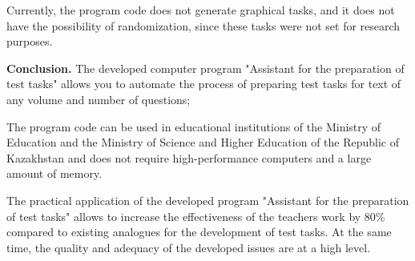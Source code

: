 \begin{multicols}{2}
Currently, the program code does not generate graphical tasks, and it
does not have the possibility of randomization, since these tasks were
not set for research purposes.

{\bfseries Conclusion.} The developed computer program "Assistant for the
preparation of test tasks" allows you to automate the process of
preparing test tasks for text of any volume and number of questions;

The program code can be used in educational institutions of the Ministry
of Education and the Ministry of Science and Higher Education of the
Republic of Kazakhstan and does not require high-performance computers
and a large amount of memory.

The practical application of the developed program "Assistant for the
preparation of test tasks" allows to increase the effectiveness of the
teacher\textquotesingle s work by 80\% compared to existing analogues
for the development of test tasks. At the same time, the quality and
adequacy of the developed issues are at a high level.
\end{multicols}


